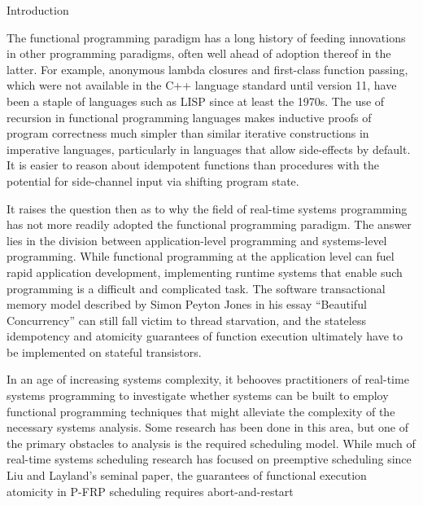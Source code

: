 \documentclass{article}
\begin{document}
\begin{section}{Introduction}
  \begin{paragraph}{}
    The functional programming paradigm has a long history of feeding innovations in other
    programming paradigms, often well ahead of adoption thereof in the latter. For example,
    anonymous lambda closures and first-class function passing, which were not available
    in the C++ language standard until version 11\autocite{CPPLambdas}, have been a staple of languages such
    as LISP since at least the 1970s\autocite[2]{HistoryOfHaskell}. The use of recursion in functional programming languages
    makes inductive proofs of program correctness much simpler than similar iterative
    constructions in imperative languages, particularly in languages that allow
    side-effects by default. It is easier to reason about idempotent functions than
    procedures with the potential for side-channel input via shifting program state.
  \end{paragraph}
  \begin{paragraph}{}
    It raises the question then as to why the field of real-time systems programming has
    not more readily adopted the functional programming paradigm. The answer lies in
    the division between application-level programming and systems-level programming.
    While functional programming at the application level can fuel rapid application
    development, implementing runtime systems that enable such programming is a difficult
    and complicated task. The software transactional memory model described by
    Simon Peyton Jones in his essay ``Beautiful Concurrency''\autocite{BeautifulConcurrency} can still fall
    victim to thread starvation\autocite{TQueueBug}, and the stateless idempotency and atomicity
    guarantees of function execution ultimately have to be implemented on stateful transistors.
  \end{paragraph}
  \begin{paragraph}{}
    In an age of increasing systems complexity, it behooves practitioners of real-time systems
    programming to investigate whether systems can be built to employ functional programming
    techniques that might alleviate the complexity of the necessary systems analysis.
    Some research has been done in this area, but one of the primary obstacles to analysis
    is the required scheduling model. While much of real-time systems scheduling research
    has focused on preemptive scheduling since Liu and Layland's seminal paper\autocite{LiuLayland1973},
    the guarantees of functional execution atomicity in P-FRP scheduling requires abort-and-restart

\end{paragraph}
\end{section}
\end{document}
